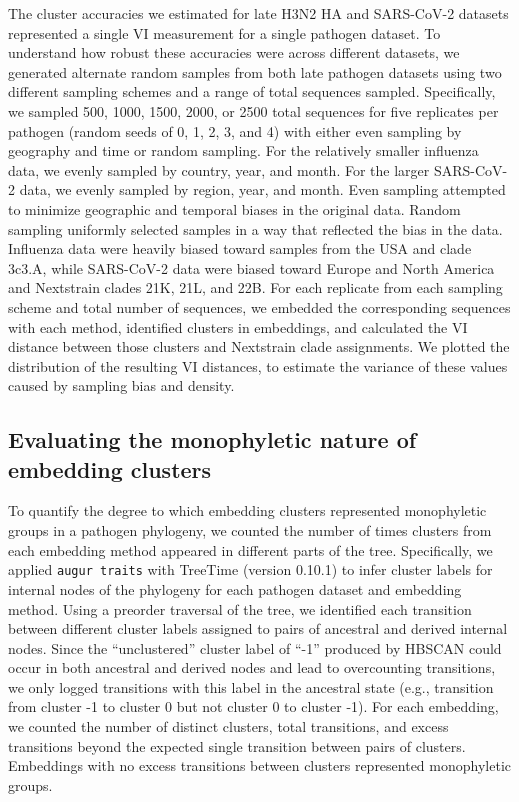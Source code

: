 \documentclass[webpdf,contemporary,large,single]{oup-authoring-template}%
\theoremstyle{thmstyleone}%
\theoremstyle{thmstyletwo}%
\theoremstyle{thmstylethree}%
\begin{document}
The cluster accuracies we estimated for late H3N2 HA and SARS-CoV-2 datasets represented a single VI measurement for a single pathogen dataset.
To understand how robust these accuracies were across different datasets, we generated alternate random samples from both late pathogen datasets using two different sampling schemes and a range of total sequences sampled.
Specifically, we sampled 500, 1000, 1500, 2000, or 2500 total sequences for five replicates per pathogen (random seeds of 0, 1, 2, 3, and 4) with either even sampling by geography and time or random sampling.
For the relatively smaller influenza data, we evenly sampled by country, year, and month.
For the larger SARS-CoV-2 data, we evenly sampled by region, year, and month.
Even sampling attempted to minimize geographic and temporal biases in the original data.
Random sampling uniformly selected samples in a way that reflected the bias in the data.
Influenza data were heavily biased toward samples from the USA and clade 3c3.A, while SARS-CoV-2 data were biased toward Europe and North America and Nextstrain clades 21K, 21L, and 22B.
For each replicate from each sampling scheme and total number of sequences, we embedded the corresponding sequences with each method, identified clusters in embeddings, and calculated the VI distance between those clusters and Nextstrain clade assignments.
We plotted the distribution of the resulting VI distances, to estimate the variance of these values caused by sampling bias and density.

\subsection{Evaluating the monophyletic nature of embedding clusters}

To quantify the degree to which embedding clusters represented monophyletic groups in a pathogen phylogeny, we counted the number of times clusters from each embedding method appeared in different parts of the tree.
Specifically, we applied \texttt{augur traits} with TreeTime (version 0.10.1) \citep{Sagulenko2018,Huddleston2021} to infer cluster labels for internal nodes of the phylogeny for each pathogen dataset and embedding method.
Using a preorder traversal of the tree, we identified each transition between different cluster labels assigned to pairs of ancestral and derived internal nodes.
Since the ``unclustered'' cluster label of ``-1'' produced by HBSCAN could occur in both ancestral and derived nodes and lead to overcounting transitions, we only logged transitions with this label in the ancestral state (e.g., transition from cluster -1 to cluster 0 but not cluster 0 to cluster -1).
For each embedding, we counted the number of distinct clusters, total transitions, and excess transitions beyond the expected single transition between pairs of clusters.
Embeddings with no excess transitions between clusters represented monophyletic groups.
\end{document}
